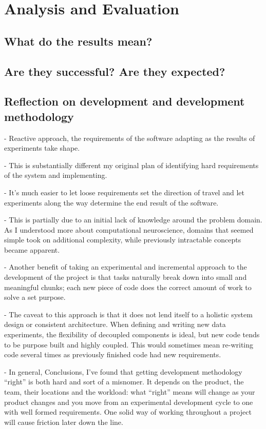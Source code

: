 \chapter{Analysis and Evaluation}

\section{What do the results mean?}

\section{Are they successful? Are they expected?}

\section{Reflection on development and development methodology}

 - Reactive approach, the requirements of the software adapting as the results
 of experiments take shape.

 - This is substantially different my original plan of identifying hard
 requirements of the system and implementing. 

 - It's much easier to let loose requirements set the direction of travel and
 let experiments along the way determine the end result of the software.

 - This is partially due to an initial lack of knowledge around the problem
 domain. As I understood more about computational neuroscience, domains that
 seemed simple took on additional complexity, while previously intractable
 concepts became apparent.

- Another benefit of taking an experimental and incremental approach to the
development of the project is that tasks naturally break down into small and
meaningful chunks; each new piece of code does the correct amount of work to
solve a set purpose.

- The caveat to this approach is that it does not lend itself to a holistic
system design or consistent architecture. When defining and writing new
data experiments, the flexibility of decoupled components is ideal, but new code
tends to be purpose built and highly coupled. This would sometimes mean
re-writing code several times as previously finished code had new requirements. 

- In general, Conclusions, I’ve found that getting development methodology
“right” is both hard and sort of a misnomer. It depends on the product, the
team, their locations and the workload: what “right” means will change as your
product changes and you move from an experimental development cycle to one with
well formed requirements. One solid way of working throughout a project will
cause friction later down the line. 

